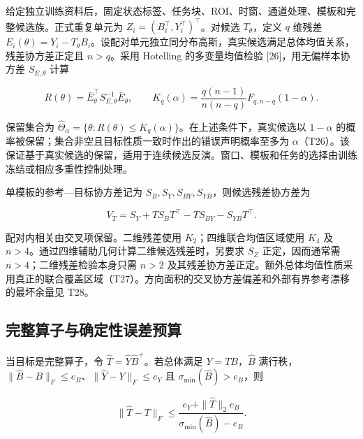 \documentclass[11pt,a4paper]{article}
\begin{document}
\par
\noindent\begin{minipage}{\linewidth}

给定独立训练资料后，固定状态标签、任务块、ROI、时窗、通道处理、模板和完整候选族。正式重复单元为
\(Z_i=(B_i^\top,Y_i^\top)^\top\)。对候选 \(T_\theta\)，定义 \(q\) 维残差
\(E_i(\theta)=Y_i-T_\theta B_i\)。设配对单元独立同分布高斯，真实候选满足总体均值关系，残差协方差正定且
\(n>q\)。采用 Hotelling 的多变量均值检验 {[}26{]}，用无偏样本协方差
\(S_{E,\theta}\) 计算

\[
R(\theta)=\bar E_\theta^\top S_{E,\theta}^{-1}\bar E_\theta,
\qquad
K_q(\alpha)=\frac{q(n-1)}{n(n-q)}F_{q,n-q}(1-\alpha).
\]

\end{minipage}\par

保留集合为
\(\widehat\Theta_\alpha=\{\theta:R(\theta)\leq K_q(\alpha)\}\)。在上述条件下，真实候选以
\(1-\alpha\)
的概率被保留；集合非空且目标性质一致时作出的错误声明概率至多为
\(\alpha\)（T26）。该保证基于真实候选的保留，适用于连续候选反演。窗口、模板和任务的选择由训练冻结或相应多重性控制处理。

\par
\noindent\begin{minipage}{\linewidth}

单模板的参考—目标协方差记为
\(S_B,S_Y,S_{BY},S_{YB}\)，则候选残差协方差为

\[
V_T=S_Y+TS_BT^\top-TS_{BY}-S_{YB}T^\top.
\]

\end{minipage}\par

配对内相关由交叉项保留。二维残差使用 \(K_2\)；四维联合均值区域使用
\(K_4\) 及 \(n>4\)。通过四维辅助几何计算二维候选残差时，另要求 \(S_Z\)
正定，因而通常需 \(n>4\)；二维残差检验本身只需 \(n>2\)
及其残差协方差正定。额外总体均值性质采用真正的联合覆盖区域（T27）。方向面积的交叉协方差偏差和外部有界参考漂移的最坏余量见
T28。

\subsection{完整算子与确定性误差预算}\label{ux5b8cux6574ux7b97ux5b50ux4e0eux786eux5b9aux6027ux8befux5deeux9884ux7b97}

\par
\noindent\begin{minipage}{\linewidth}

当目标是完整算子，令 \(\widehat T=\widehat Y\widehat B^+\)。若总体满足
\(Y=TB\)，\(\widehat B\)
满行秩，\(\|\widehat B-B\|_F\leq e_B\)、\(\|\widehat Y-Y\|_F\leq e_Y\)
且 \(\sigma_{\min}(\widehat B)>e_B\)，则

\[
\|\widehat T-T\|_F\leq
\frac{e_Y+\|\widehat T\|_2e_B}
{\sigma_{\min}(\widehat B)-e_B}.
\]

\end{minipage}\par
\end{document}
